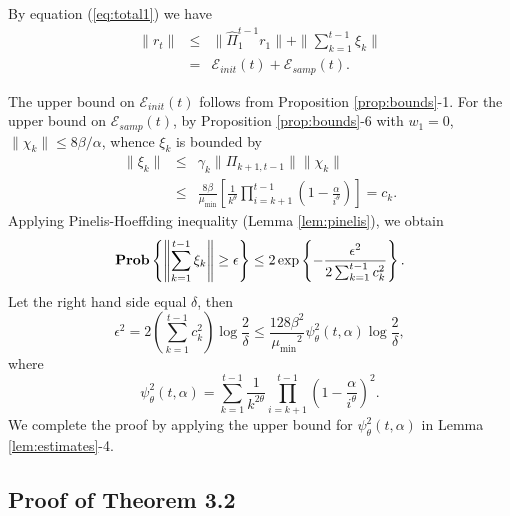 \documentclass[twoside,twocolumn,journal]{IEEEtran}
\newenvironment{pf}[1][Proof]{\medskip\noindent\hspace{1em}{\itshape #1: }}{\hspace*{\fill}~\QED\par\endtrivlist\medskip}
\def\Err{{\mathscr E}}
\def\Prob{{\bf Prob}}
\def\amin{{\mu_{\min}} }
\begin{document}

\begin{pf}[Proof of Theorem \ref{thm:robmon}] By equation (\ref{eq:total1}) we have
\begin{eqnarray*}
\|r_{t}\| & \leq & \|\hat{\Pi}_1^{t-1} r_1\| + \| \sum_{k=1}^{t-1}\xi_k \|\\
& = & \Err_{init}(t)+\Err_{samp}(t).
\end{eqnarray*}

The upper bound on $\Err_{init}(t)$ follows from Proposition \ref{prop:bounds}-1. For the upper bound on $\Err_{samp}(t)$,
by Proposition \ref{prop:bounds}-6 with $w_1=0$, $\|\chi_k\|\leq 8\beta/\alpha$, whence $\xi_k$ is bounded by
\begin{eqnarray*}
\|\xi_k\| & \leq  & \gamma_k \|\Pi_{k+1,t-1}\| \|\chi_k \| \\
& \leq & \frac{8\beta}{\amin} \left[\frac{1}{k^\theta} \prod_{i=k+1}^{t-1} \left( 1- \frac{\alpha}{i^\theta}\right)\right] = c_k.
\end{eqnarray*}
Applying Pinelis-Hoeffding inequality (Lemma \ref{lem:pinelis}), we obtain
\[ \Prob \left\{ \left\|\sum_{k=1}^{t-1} \xi_k \right\| \geq \epsilon \right\} \leq
2 \exp \left\{-\frac{\epsilon^2}{2\sum_{k=1}^{t-1} c_k^2} \right\}. \]
Let the right hand side equal $\delta$, then
\[
\epsilon^2 = 2 \left(\sum_{k=1}^{t-1} c_k^2\right) \log \frac{2}{\delta} \leq \frac{128\beta^2}{\amin^2} \psi^2_{\theta}(t,\alpha) \log \frac{2}{\delta},
\]
where
\[ \psi^2_\theta(t,\alpha)= \sum_{k=1}^{t-1} \frac{1}{k^{2\theta}} \prod_{i=k+1}^{t-1} \left(1-\frac{\alpha}{i^\theta}\right)^2.\]
We complete the proof by applying the upper bound for $\psi^2_{\theta}(t,\alpha)$ in Lemma \ref{lem:estimates}-4.
\end{pf}

\subsection{Proof of Theorem 3.2}
\end{document}
